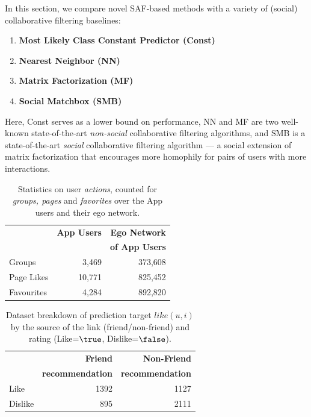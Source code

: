 In this section, we compare novel SAF-based methods with a
variety of (social) collaborative filtering baselines:
\begin{enumerate}
\item {\bf Most Likely Class Constant Predictor (Const)}
\item {\bf Nearest Neighbor (NN)}~\cite{bellkor}
\item {\bf Matrix Factorization (MF)}~\cite{pmf}
\item {\bf Social Matchbox (SMB)}~\cite{Noel2012NOF}
\end{enumerate}
Here, Const serves as a lower bound on performance, NN and MF are two
well-known state-of-the-art \emph{non-social} collaborative filtering
algorithms, and SMB is a state-of-the-art \emph{social} collaborative
filtering algorithm --- a social extension of matrix factorization that
encourages more homophily for pairs of users with more interactions.


\begin{table}[t!]
\centering
\begin{tabular}{|>{\small}l|>{\small}r|>{\small}r|}
\hline
& \textbf{App Users} & \textbf{Ego Network} \\
& & \textbf{of App Users} \\
\hline
Groups & 3,469 & 373,608 \\
\hline
Page Likes & 10,771 & 825,452 \\
\hline
Favourites & 4,284 & 892,820\\
\hline
\end{tabular}
\caption{Statistics on user {\em actions}, counted for {\em groups, pages} and {\em favorites} over the App users and their ego network.}
\label{tab:interests}
\end{table}

\begin{table}[t!]
\centering
\begin{tabular}{|>{\small}l|>{\small}r|>{\small}r|}\hline
&\textbf{Friend}  & \textbf{Non-Friend} \\
&\textbf{recommendation}  & \textbf{recommendation} \\
\hline
Like& 1392 & 1127 \\
\hline
Dislike& 895 & 2111\\
\hline
\end{tabular}
\caption{Dataset breakdown of prediction target $like(u,i)$ by the source of the link (friend/non-friend) and rating (Like=$\true$, Dislike=$\false$).}
\label{tab:likeinfo}
\end{table}


